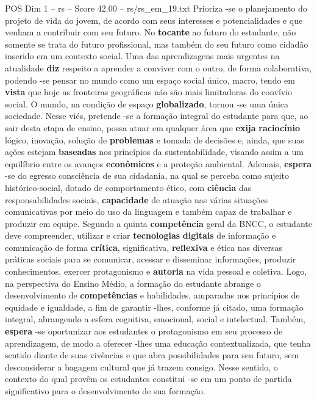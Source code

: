 \begin{textsample}{POS Dim 1 – rs – Score 42.00 – rs/rs\_em\_19.txt}
Prioriza -se o planejamento do projeto de vida do jovem, de acordo com seus interesses e potencialidades e que venham a contribuir com seu futuro.
No \textbf{tocante} ao futuro do estudante, não somente se trata do futuro profissional, mas também do seu futuro como cidadão inserido em um contexto social.
Uma das aprendizagens mais urgentes na atualidade \textbf{diz} respeito a aprender a conviver com o outro, de forma colaborativa, podendo -se pensar no mundo como um espaço social único, macro, tendo em \textbf{vista} que hoje as fronteiras geográficas não são mais limitadoras do convívio social.
O mundo, na condição de espaço \textbf{globalizado}, tornou -se uma única sociedade.
Nesse viés, pretende -se a formação integral do estudante para que, ao sair desta etapa de ensino, possa atuar em qualquer área que \textbf{exija} \textbf{raciocínio} lógico, inovação, solução de \textbf{problemas} e tomada de decisões e, ainda, que suas ações estejam \textbf{baseadas} nos princípios da sustentabilidade, visando assim a um equilíbrio entre os avanços \textbf{econômicos} e a proteção ambiental.
Ademais, \textbf{espera} -se do egresso consciência de sua cidadania, na qual se perceba como sujeito histórico-social, dotado de comportamento ético, com \textbf{ciência} das responsabilidades sociais, \textbf{capacidade} de atuação nas várias situações comunicativas por meio do uso da linguagem e também capaz de trabalhar e produzir em equipe.
Segundo a quinta \textbf{competência} geral da BNCC, o estudante deve compreender, utilizar e criar \textbf{tecnologias} \textbf{digitais} de informação e comunicação de forma \textbf{crítica}, significativa, \textbf{reflexiva} e ética nas diversas práticas sociais para se comunicar, acessar e disseminar informações, produzir conhecimentos, exercer protagonismo e \textbf{autoria} na vida pessoal e coletiva.
Logo, na perspectiva do Ensino Médio, a formação do estudante abrange o desenvolvimento de \textbf{competências} e habilidades, amparadas nos princípios de equidade e igualdade, a fim de garantir -lhes, conforme já citado, uma formação integral, abrangendo a esfera cognitiva, emocional, social e intelectual.
Também, \textbf{espera} -se oportunizar aos estudantes o protagonismo em seu processo de aprendizagem, de modo a oferecer -lhes uma educação contextualizada, que tenha sentido diante de suas vivências e que abra possibilidades para seu futuro, sem desconsiderar a bagagem cultural que já trazem consigo.
Nesse sentido, o contexto do qual provêm os estudantes constitui -se em um ponto de partida significativo para o desenvolvimento de sua formação.

\end{textsample}
